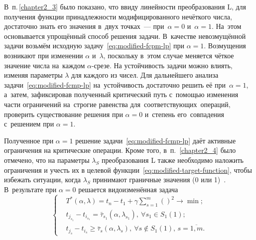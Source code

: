 В~п.\,\ref{chapter2_3} было показано, что ввиду линейности преобразования L, для получения функции принадлежности модифицированного нечёткого числа, достаточно знать его значения в~двух точках~--- при~$\alpha=0$ и~$\alpha=1$. На~этом основывается упрощённый способ решения задачи. В~качестве невозмущённой задачи возьмём исходную задачу~\eqref{eq:modified-fcpm-lp} при $\alpha=1$. Возмущения возникают при изменении $\alpha$ и~$\lambda$, поскольку в~этом случае меняется чёткое значение числа на~каждом $\alpha$-срезе. На устойчивость задачи можно влиять, изменяя параметры $\lambda$ для каждого из чисел. Для дальнейшего анализа задачи~\eqref{eq:modified-fcmp-lp} на~устойчивость достаточно решить её при~$\alpha=1$, а~затем, зафиксировав полученный критический путь с~помощью изменения части ограничений на~строгие равенства для~соответствующих~операций, проверить существование решения при $\alpha=0$ и~степень его~совпадения с~решением при $\alpha=1$.

Полученное при $\alpha=1$ решение задачи~\eqref{eq:modified-fcmp-lp} даёт активные ограничения на критические операции. Кроме того, в~п.~\ref{chapter2_4} было отмечено, что на параметры $\lambda_S$ преобразования L также необходимо наложить ограничения и учесть их в целевой функции~\eqref{eq:modified-target-function}, чтобы избежать ситуации, когда $\lambda_S$ принимают граничные значения (0 или 1)~\cite{Vorontsov_VSTU}. В~результате при $\alpha=0$ решается видоизменённая задача
\begin{equation}
\label{eq:modified-fcpm-lp-alpha}
  \left \{ \begin{aligned}
    & T^* \left(\alpha, \lambda \right) = t_n-t_1+\gamma \sum \limits_{s=1}^{m} \left( \right)^2 \to \min; \\
    & t_{j_{s_1}}-t_{i_{s_1}} = \bar{\tau}_{s_1}\left(\alpha, \lambda_{s_1} \right),\ \forall s_1 \in S_1\left(1\right); \\
    & t_{j_s}-t_{i_s} \geqslant \bar{\tau}_s\left(\alpha, \lambda_s \right),\ \forall s \notin S_1\left(1\right),\,s=\overline{1,m}.
  \end{aligned} \right.
\end{equation}

